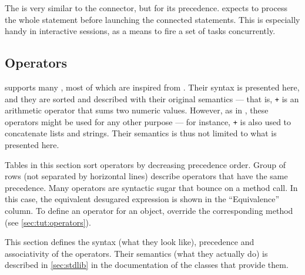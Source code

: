 \subsubsection{\samp{\&}}

The \samp{\&} is very similar to the \samp{,} connector, but for its
precedence.  \urbi expects to process the whole statement before launching
the connected statements.  This is especially handy in interactive sessions,
as a means to fire a set of tasks concurrently.


\subsection{Operators}
\label{sec:lang:op}
\us supports many , most of which are inspired from
\Cxx. Their syntax is presented here, and they are sorted and described with
their original semantics --- that is, \lstinline|+| is an arithmetic
operator that sums two numeric values. However, as in \Cxx, these operators
might be used for any other purpose --- for instance, \lstinline|+| is also
used to concatenate lists and strings.  Their semantics is thus not limited
to what is presented here.

Tables in this section sort operators by decreasing precedence order.  Group
of rows (not separated by horizontal lines) describe operators that have the
same precedence. Many operators are syntactic sugar that bounce on a method
call. In this case, the equivalent desugared expression is shown in the
``Equivalence'' column.  To define an operator for an object, override the
corresponding method (see \autoref{sec:tut:operators}).

This section defines the syntax (what they look like), precedence and
associativity of the operators. Their semantics (what they actually do) is
described in \autoref{sec:stdlib} in the documentation of the classes that
provide them.


\newcommand{\operator}[6][]{%
  \lstinline@#2@ & \lstinline@#3@ & #4 & #5 & \lstinline@#6@#1%
}

\newcommand{\boperator}[3]{%
  \operator{#1}{a #1 b}{#2}{#3}{a.'#1'(b)}%
}

\newcommand{\poperator}[3]{%
  \operator{#1}{#1a}{#2}{#3}{a.'#1'()}%
}

\newcommand{\operatorin}     {\operator  {in}     {a in b}       {None}     {Membership}            {b.has(a)}          }
\newcommand{\operatornotin}  {\operator  {not in} {a not in b}   {None}     {Non-membership}        {b.hasNot(a)}      }
\newcommand{\operatorsub}    {\operator  {[]}   {a[args]}        {Left}     {Subscript}             {a.'[]'(args)}          }
\newcommand{\operatorsubass} {\operator  {[] =} {a[args] = v}    {Right}     {Subscript assignment}  {a.'[]='(args, v)}      }

